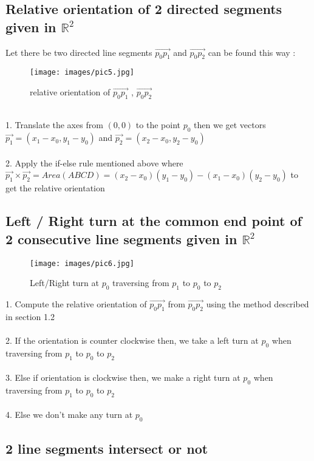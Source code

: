 \documentclass{article}
\begin{document}
    \subsection{Relative orientation of 2 directed segments given in $\mathbb{R}^{2}$} 
    Let there be two directed line segments $ \overrightarrow{p_{0}p_{1}}$ and $\overrightarrow{p_{0}p_{2}}$ can be found this way : 
    \begin{figure}[h]
    \caption{relative orientation of $\overrightarrow{p_{0}p_{1}}$ , $\overrightarrow{p_{0}p_{2}}$ }
    \centering
    \texttt{[image: images/pic5.jpg]}
    \end{figure} \\
    1. Translate the axes from $(0,0)$ to the point $p_{0}$ then we get vectors $ \Vec{p_{1}}=(x_{1}-x_{0},y_{1}-y_{0})$ and $\Vec{p_{2}}=(x_{2}-x_{0},y_{2}-y_{0}) $ \\ \\
    2. Apply the if-else rule mentioned above where $ \Vec{p_{1}} \times \Vec{p_{2}} = Area(ABCD) = (x_{2} - x_{0})(y_{1} - y_{0}) - (x_{1} - x_{0})(y_{2} - y_{0})$ to get the relative orientation

    \subsection{Left / Right turn at the common end point of 2 consecutive line segments given in $\mathbb{R}^{2}$}
    \begin{figure}[h] 
    \caption{Left/Right turn at $p_0$ traversing from $p_{1}$ to $p_{0}$ to $p_{2}$}
    \centering
    \texttt{[image: images/pic6.jpg]}
    \end{figure}
    1. Compute the relative orientation of $\overrightarrow{p_{0}p_{1}}$ from $\overrightarrow{p_{0}p_{2}}$ using the method described in section 1.2 \\ \\
    2. If the orientation is counter clockwise then, we take a left turn at $p_{0}$ when traversing from $p_{1}$ to $p_{0}$ to $p_{2}$ \\ \\
    3. Else if orientation is clockwise then, we make a right turn at $p_{0}$ when traversing from $p_{1}$ to $p_{0}$ to $p_{2}$ \\ \\
    4. Else we don't make any turn at $p_{0}$

    \subsection{2 line segments intersect or not}
\end{document}
